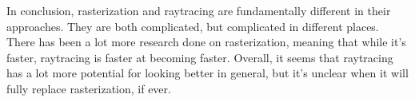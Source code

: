 \documentclass{article}
\begin{document}
In conclusion, rasterization and raytracing are fundamentally different in their approaches. They are both complicated, but complicated in different places. There has been a lot more research done on rasterization, meaning that while it's faster, raytracing is faster at becoming faster. Overall, it seems that raytracing has a lot more potential for looking better in general, but it's unclear when it will fully replace rasterization, if ever.
\end{document}
